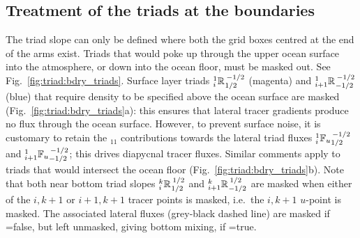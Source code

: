 \subsection{Treatment of the triads at the boundaries}\label{sec:triad:iso_bdry}
The triad slope can only be defined where both the grid boxes centred at
the end of the arms exist. Triads that would poke up
through the upper ocean surface into the atmosphere, or down into the
ocean floor, must be masked out. See Fig.~\ref{fig:triad:bdry_triads}. Surface layer triads
$\triad{i}{1}{R}{1/2}{-1/2}$ (magenta) and
$\triad{i+1}{1}{R}{-1/2}{-1/2}$ (blue) that require density to be
specified above the ocean surface are masked (Fig.~\ref{fig:triad:bdry_triads}a): this ensures that lateral
tracer gradients produce no flux through the ocean surface. However,
to prevent surface noise, it is customary to retain the $_{11}$ contributions towards
the lateral triad fluxes $\triad[u]{i}{1}{F}{1/2}{-1/2}$ and
$\triad[u]{i+1}{1}{F}{-1/2}{-1/2}$; this drives diapycnal tracer
fluxes. Similar comments apply to triads that would intersect the
ocean floor (Fig.~\ref{fig:triad:bdry_triads}b). Note that both near bottom
triad slopes $\triad{i}{k}{R}{1/2}{1/2}$ and
$\triad{i+1}{k}{R}{-1/2}{1/2}$ are masked when either of the $i,k+1$
or $i+1,k+1$ tracer points is masked, i.e.\ the $i,k+1$ $u$-point is
masked. The associated lateral fluxes (grey-black dashed line) are
masked if =false, but left unmasked,
giving bottom mixing, if =true.

